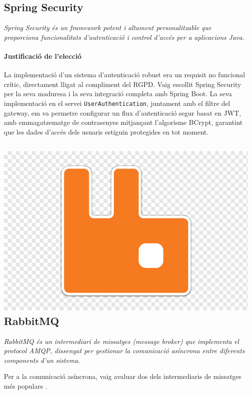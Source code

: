 \subsection{\springsecurity\hspace{0.5em}Spring Security}
\textit{Spring Security és un framework potent i altament personalitzable que proporciona funcionalitats d'autenticació i control d'accés per a aplicacions Java.}

\paragraph{Justificació de l'elecció}
La implementació d'un sistema d'autenticació robust era un requisit no funcional crític, directament lligat al compliment del RGPD. Vaig escollit Spring Security per la seva maduresa i la seva integració completa amb Spring Boot. La seva implementació en el servei \texttt{UserAuthentication}, juntament amb el filtre del gateway, em va permetre configurar un flux d'autenticació segur basat en JWT, amb emmagatzematge de contrasenyes mitjançant l'algorisme BCrypt, garantint que les dades d'accés dels usuaris estiguin protegides en tot moment.

\newcommand{\rabbit}{\includegraphics[height=8ex]{Figures/logos/rabbitmq.png}}

\subsection{\rabbit\hspace{0.5em}RabbitMQ}
\textit{RabbitMQ és un intermediari de missatges (message broker) que implementa el protocol AMQP, dissenyat per gestionar la comunicació asíncrona entre diferents components d'un sistema}.

Per a la comunicació asíncrona, vaig avaluar dos dels intermediaris de missatges més populars \cite{cloudamqp-rabbitmq-kafka}.

